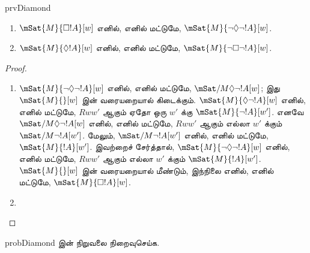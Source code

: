 \documentclass[../../../include/open-logic-section]{subfiles}
\begin{document}
\begin{tagblock}{prvDiamond}
\begin{prop}
  \begin{enumerate}
  \item $\mSat{M}{\Box !A}[w]$ எனில், எனில் மட்டுமே,
    $\mSat{M}{\lnot\Diamond\lnot !A}[w]$.
  \item $\mSat{M}{\Diamond !A}[w]$ எனில், எனில் மட்டுமே,
    $\mSat{M}{\lnot\Box\lnot !A}[w]$.
  \end{enumerate}
\end{prop}

\begin{proof}
  \begin{enumerate}
    \item $\mSat{M}{\lnot\Diamond\lnot !A}[w]$ எனில், எனில் மட்டுமே,
    $\mSat/{M}{\Diamond\lnot !A}[w]$; இது $\mSat{M}{}[w]$ இன்
    வரையறையால் கிடைக்கும். $\mSat{M}{\Diamond\lnot !A}[w]$ எனில், எனில்
    மட்டுமே, $Rww'$ ஆகும் ஏதோ ஒரு $w'$ க்கு $\mSat{M}{\lnot !A}[w']$.
    எனவே $\mSat/{M}{\Diamond\lnot !A}[w]$ எனில், எனில் மட்டுமே, $Rww'$
    ஆகும் எல்லா $w'$ க்கும் $\mSat/{M}{\lnot !A}[w']$. மேலும்,
    $\mSat/{M}{\lnot !A}[w']$ எனில், எனில் மட்டுமே,
    $\mSat{M}{!A}[w']$. இவற்றைச் சேர்த்தால்,
    $\mSat{M}{\lnot\Diamond\lnot !A}[w]$ எனில், எனில் மட்டுமே, $Rww'$
    ஆகும் எல்லா $w'$ க்கும் $\mSat{M}{!A}[w']$. $\mSat{M}{}[w]$ இன்
    வரையறையால் மீண்டும், இந்நிலை எனில், எனில் மட்டுமே,
    $\mSat{M}{\Box !A}[w]$.
    \item {}
  \end{enumerate}
\end{proof}

\begin{probtag}{probDiamond}
   இன் நிறுவலை நிறைவுசெய்க.
\end{probtag}
\end{tagblock}
\end{document}
